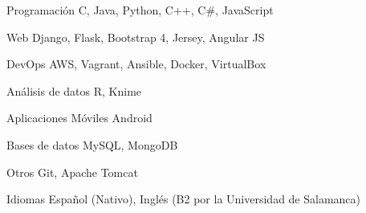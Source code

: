 


\begin{cvskills}


\cvskill
{Programación} %
{C, Java, Python, C++, C\#, JavaScript } %


\cvskill
{Web} %
{Django, Flask, Bootstrap 4, Jersey, Angular JS} %


\cvskill
{DevOps} %
{AWS, Vagrant, Ansible, Docker, VirtualBox} %


\cvskill
{Análisis de datos} %
{R, Knime} %


\cvskill
{Aplicaciones Móviles} %
{Android} %


\cvskill
{Bases de datos} %
{MySQL, MongoDB} %


\cvskill
{Otros} %
{Git, Apache Tomcat} %


\cvskill
{Idiomas} %
{Español (Nativo), Inglés (B2 por la Universidad de Salamanca)} %


\end{cvskills}